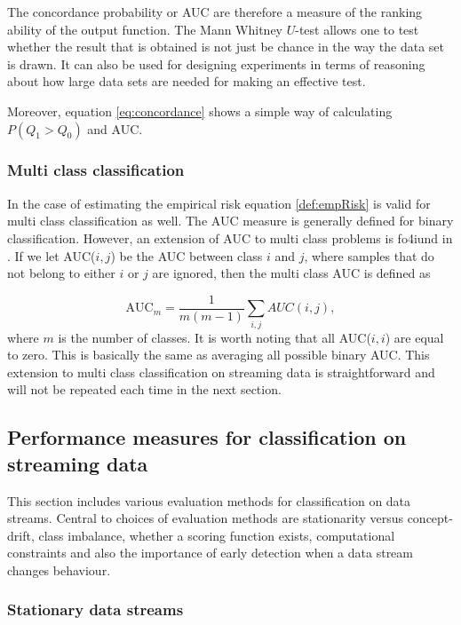 The concordance probability or AUC are therefore a measure of the ranking ability of the output function.  The Mann Whitney $U$-test allows one to test whether the result that is obtained is not just be chance in the way the data set is drawn.  It can also be used for designing experiments in terms of reasoning about how large data sets are needed for making an effective test.

Moreover, equation \eqref{eq:concordance} shows a simple way of calculating $P(Q_1 > Q_0)$ and AUC.

\subsubsection{Multi class classification}

In the case of estimating the empirical risk equation \eqref{def:empRisk} is valid for multi class classification as well.  The AUC measure is generally defined for binary classification.  However, an extension of AUC to multi class problems is fo4iund in \cite{Han01}.  If we let AUC($i,j$) be the AUC between class $i$ and $j$, where samples that do not belong to either $i$ or $j$ are ignored, then the multi class AUC is defined as 


\begin{equation} 
\label{eq:multiAUC}
\mbox{AUC}_m = \frac{1}{m(m-1)}\sum_{i,j} AUC(i,j),
\end{equation}
where $m$ is the number of classes.  It is worth noting that all AUC($i,i$) are equal to zero. This is basically the same as averaging all possible binary AUC.  This extension to multi class classification on streaming data is straightforward and will not be repeated each time in the next section.

\subsection{Performance measures for classification on streaming data}
\label{sec:stream}

This section includes various evaluation methods for classification on data streams.  Central to choices of evaluation methods are stationarity versus concept-drift, class imbalance, whether a scoring function exists, computational constraints and also the importance of early detection when a data stream changes behaviour.

\subsubsection{Stationary data streams}
\label{sec:stationary}


